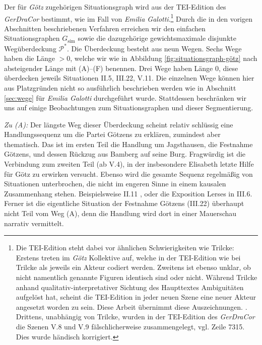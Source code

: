 \documentclass[a4paper,10pt,abstract=true,headings=small]{scrartcl}
\begin{document}
Der für \emph{Götz} zugehörigen Situationsgraph wird aus der TEI-Edition des \emph{GerDraCor} bestimmt, wie im Fall von \emph{Emilia Galotti}.\footnote{
Die TEI-Edition steht dabei vor ähnlichen Schwierigkeiten wie Trilcke:
Erstens treten im \emph{Götz} Kollektive auf, welche in der TEI-Edition wie bei Trilcke als jeweils ein Akteur codiert werden.
Zweitens ist ebenso unklar, ob nicht namentlich genannte Figuren identisch sind oder nicht.
Während Trilcke anhand qualitativ-interpretativer Sichtung des Haupttextes Ambiguitäten aufgelöst hat, scheint die TEI-Edition in jeder neuen Szene eine neuer Akteur angesetzt worden zu sein.
Diese Arbeit übernimmt diese Auszeichnungen.
\cite[Vgl.][Fn.~77]{trilcke_social_2013}.
Drittens, unabhängig von Trilcke, wurden in der TEI-Edition des \emph{GerDraCor} die Szenen V.8 und V.9 fälschlicherweise zusammengelegt, vgl. Zeile 7315. Dies wurde händisch korrigiert. 
}
Durch die in den vorigen Abschnitten beschriebenen Verfahren erreichen wir den einfachen Situationsgraphen $G_\text{sim}$ sowie die dazugehörige gewichtsmaximale disjunkte Wegüberdeckung $\mathcal{P}^*$.
Die Überdeckung besteht aus neun Wegen.
Sechs Wege haben die Länge $>0$, welche wir wie in Abbildung \ref{fig:situationsgraph-götz} nach absteigender Länge mit (A)–(F) benennen.
Drei Wege haben Länge $0$, diese überdecken jeweils Situationen II.5, III.22, V.11.
Die einzelnen Wege können hier aus Platzgründen nicht so ausführlich beschrieben werden wie in Abschnitt \ref{sec:wege} für \emph{Emilia Galotti} durchgeführt wurde.
Stattdessen beschränken wir uns auf einige Beobachtungen zum Situationsgraphen und dieser Segmentierung.

\emph{Zu (A):} Der längste Weg dieser Überdeckung scheint relativ schlüssig eine Handlungssequenz um die Partei Götzens zu erklären, zumindest aber thematisch.
Das ist im ersten Teil die Handlung um Jagsthausen, die Festnahme Götzens, und dessen Rückzug aus Bamberg auf seine Burg.
Fragwürdig ist die Verbindung zum zweiten Teil (ab V.4), in der insbesondere Elisabeth letzte Hilfe für Götz zu erwirken versucht.
Ebenso wird die gesamte Sequenz regelmäßig von Situationen unterbrochen, die nicht im engeren Sinne in einem kausalen Zusammenhang stehen.
Beispielsweise II.11 , oder die Exposition Lerses in III.6.
Ferner ist die eigentliche Situation der Festnahme Götzens (III.22) überhaupt nicht Teil vom Weg (A), denn die Handlung wird dort in einer Mauerschau narrativ vermittelt.
\end{document}

